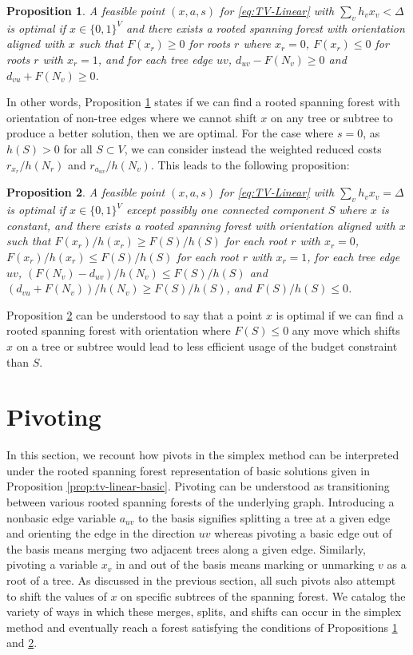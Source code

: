 \documentclass[titlepage,11pt]{article}
\newtheorem{proposition}{Proposition}
\begin{document}
\begin{proposition}\label{prop:optimality-sub-budget}
    A feasible point $(x, a, s)$ for \eqref{eq:TV-Linear} with $\sum_{v}h_vx_v < \Delta$ is optimal if $x \in \{0,1\}^V$ and there exists a rooted spanning forest with orientation aligned with $x$ such that $F(x_r) \ge 0$ for roots $r$ where $x_r = 0$, $F(x_r) \le 0$ for roots $r$ with $x_r = 1$, and for each tree edge $uv$, $d_{uv} - F(N_v) \ge 0$ and $d_{vu} + F(N_v) \ge 0$.
\end{proposition}
In other words, Proposition \ref{prop:optimality-sub-budget} states if we can find a rooted spanning forest with orientation of non-tree edges where we cannot shift $x$ on any tree or subtree to produce a better solution, then we are optimal.  For the case where $s = 0$, as $h(S) > 0$ for all $S \subset V$, we can consider instead the weighted reduced costs $r_{x_r}/h(N_r)$ and $r_{a_{uv}}/h(N_v)$. This leads to the following proposition:
\begin{proposition}\label{prop:optimality-equal-budget}
    A feasible point $(x, a, s)$ for \eqref{eq:TV-Linear} with $\sum_v h_vx_v = \Delta$ is optimal if $x \in \{0, 1\}^V$ except possibly one connected component $S$ where $x$ is constant, and there exists a rooted spanning forest with orientation aligned with $x$ such that $F(x_r)/h(x_r) \ge F(S)/h(S)$ for each root $r$ with $x_r = 0$, $F(x_r)/h(x_r) \le F(S)/h(S)$ for each root $r$ with $x_r = 1$,  for each tree edge $uv$, $(F(N_v) - d_{uv})/h(N_v) \le F(S)/h(S)$ and $(d_{vu} + F(N_v))/h(N_v) \ge F(S)/h(S)$, and $F(S)/h(S) \le 0$.
\end{proposition}
Proposition \ref{prop:optimality-equal-budget} can be understood to say that a point $x$ is optimal if we can find a rooted spanning forest with orientation where $F(S) \le 0$ any move which shifts $x$ on a tree or subtree would lead to less efficient usage of the budget constraint than $S$.

\section{Pivoting}\label{sec:pivoting}

In this section, we recount how pivots in the simplex method can be interpreted under the rooted spanning forest representation of basic solutions given in Proposition \ref{prop:tv-linear-basic}. Pivoting can be understood as transitioning between various rooted spanning forests of the underlying graph. 
Introducing a nonbasic edge variable $a_{uv}$ to the basis signifies splitting a tree at a given edge and orienting the edge in the direction $uv$ whereas pivoting a basic edge out of the basis means merging two adjacent trees along a given edge. 
Similarly, pivoting a variable $x_v$ in and out of the basis means marking or unmarking $v$ as a root of a tree.
As discussed in the previous section, all such pivots also attempt to shift the values of $x$ on specific subtrees of the spanning forest.
We catalog the variety of ways in which these merges, splits, and shifts can occur in the simplex method and eventually reach a forest satisfying the conditions of Propositions \ref{prop:optimality-sub-budget} and \ref{prop:optimality-equal-budget}.
\end{document}
